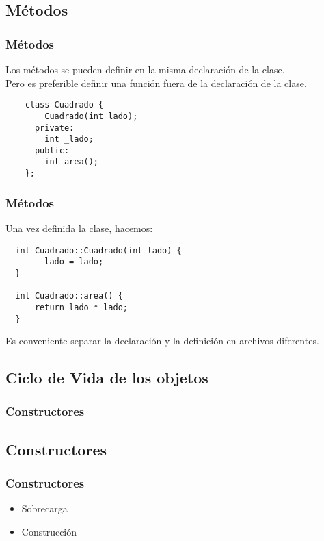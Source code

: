 \documentclass{beamer}
\begin{document}
\subsection{Métodos}
\begin{frame}[fragile]
\frametitle{Métodos}
   Los métodos se pueden definir en la misma declaración de la clase. \\
   Pero es preferible definir una función fuera de la declaración de la clase. 
   \begin{verbatim}
    class Cuadrado {
        Cuadrado(int lado);
      private:
        int _lado;
      public:
        int area();
    };
\end{verbatim}
\end{frame}

\begin{frame}[fragile]
\frametitle{Métodos}
   
   Una vez definida la clase, hacemos:
\begin{verbatim}
  int Cuadrado::Cuadrado(int lado) {
       _lado = lado;
  }

  int Cuadrado::area() {
      return lado * lado;
  }
\end{verbatim}

\begin{block}
Es conveniente separar la declaración y la definición en archivos diferentes.
\end{block}
\end{frame}

\subsection{Ciclo de Vida de los objetos}

\begin{frame}
\frametitle{Constructores}

\end{frame}

\subsection{Constructores}
\begin{frame}
\frametitle{Constructores}

\begin{itemize}
 \item Sobrecarga
 \item Construcción
\end{itemize}

\end{frame}
\end{document}
